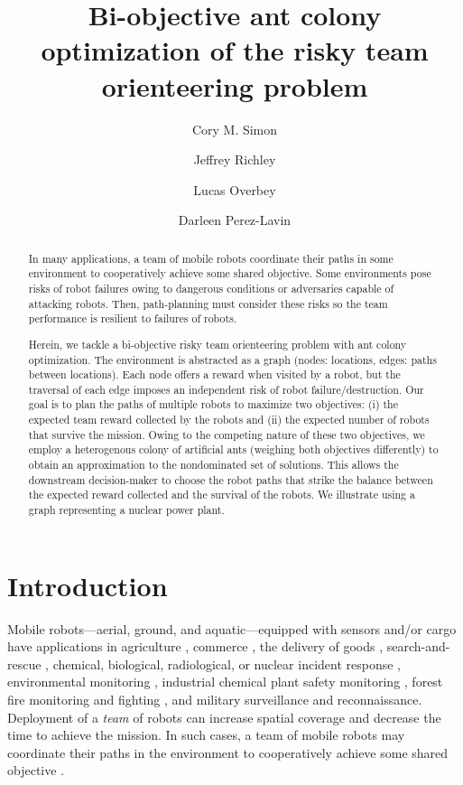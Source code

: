\documentclass[11pt, oneside]{article}
\title{Bi-objective ant colony optimization of the risky team orienteering problem}
\author[1]{Cory M. Simon}
\author[2]{Jeffrey Richley}
\author[2]{Lucas Overbey}
\author[2]{Darleen Perez-Lavin}
\affil[1]{School of Chemical, Biological, and Environmental Engineering. Oregon State University. Corvallis, OR. USA.}
\affil[2]{Naval Information Warfare Center Atlantic. Charleston, SC. USA.}
\begin{document}
\maketitle

\begin{abstract}
In many applications, a team of mobile robots coordinate their paths in some environment to cooperatively achieve some shared objective. Some environments pose risks of robot failures owing to dangerous conditions or adversaries capable of attacking robots. Then, path-planning must consider these risks so the team performance is resilient to failures of robots.

Herein, we tackle a bi-objective risky team orienteering problem with ant colony optimization. The environment is abstracted as a graph (nodes: locations, edges: paths between locations). Each node offers a reward when visited by a robot, but the traversal of each edge imposes an independent risk of robot failure/destruction. Our goal is to plan the paths of multiple robots to maximize two objectives: (i) the expected team reward collected by the robots and (ii) the expected number of robots that survive the mission. Owing to the competing nature of these two objectives, we employ a heterogenous colony of artificial ants (weighing both objectives differently) to obtain an approximation to the nondominated set of solutions. This allows the downstream decision-maker to choose the robot paths that strike the balance between the expected reward collected and the survival of the robots. We illustrate using a graph representing a nuclear power plant.
\end{abstract}

\clearpage

\section{Introduction}
Mobile robots---aerial, ground, and aquatic---equipped with sensors and/or cargo have applications in agriculture \cite{santos2020path}, commerce \cite{bogue2016growth}, the delivery of goods \cite{coelho2014thirty}, search-and-rescue \cite{queralta2020collaborative}, chemical, biological, radiological, or nuclear incident response \cite{murphy2012projected}, environmental monitoring \cite{dunbabin2012robots}, industrial chemical plant safety monitoring \cite{soldan2014towards}, forest fire monitoring and fighting \cite{merino2012unmanned}, and military surveillance and reconnaissance. 
Deployment of a \emph{team} of robots can increase spatial coverage and decrease the time to achieve the mission. 
In such cases, a team of mobile robots may coordinate their paths in the environment to cooperatively achieve some shared objective \cite{parker2007distributed}.
\end{document}
